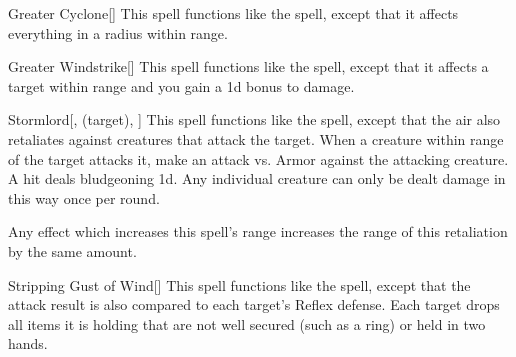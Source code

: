 \lowercase{\hypertarget{spell:Greater Cyclone}{}}\label{spell:Greater Cyclone}
\begin{apability}[\nth{3}]{\hypertarget{spell:Greater Cyclone}{Greater Cyclone}}[]
This spell functions like the  spell, except that it affects everything in a \areamed radius within \rnglong range.
\end{apability}
\vspace{0.25em}



\lowercase{\hypertarget{spell:Greater Windstrike}{}}\label{spell:Greater Windstrike}
\begin{apability}[\nth{3}]{\hypertarget{spell:Greater Windstrike}{Greater Windstrike}}[]
This spell functions like the  spell, except that it affects a target within \rnglong range and you gain a \plus1d bonus to damage.
\end{apability}
\vspace{0.25em}



\lowercase{\hypertarget{spell:Stormlord}{}}\label{spell:Stormlord}
\begin{attuneability}[\nth{3}]{\hypertarget{spell:Stormlord}{Stormlord}}[,  (target), ]
This spell functions like the  spell, except that the air also retaliates against creatures that attack the target.
When a creature within \rngclose range of the target attacks it, make an attack vs. Armor against the attacking creature.
A hit deals bludgeoning  \minus1d.
Any individual creature can only be dealt damage in this way once per round.

Any effect which increases this spell's range increases the range of this retaliation by the same amount.
\end{attuneability}
\vspace{0.25em}



\lowercase{\hypertarget{spell:Stripping Gust of Wind}{}}\label{spell:Stripping Gust of Wind}
\begin{apability}[\nth{3}]{\hypertarget{spell:Stripping Gust of Wind}{Stripping Gust of Wind}}[]
This spell functions like the  spell, except that the attack result is also compared to each target's Reflex defense.
\hit Each target drops all items it is holding that are not well secured (such as a ring) or held in two hands.
\end{apability}
\vspace{0.25em}



